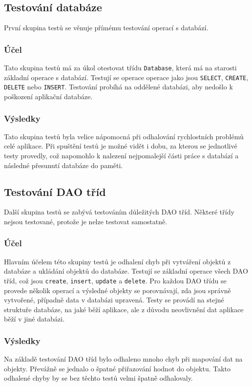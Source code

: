 \documentclass[thesis=B,czech]{resources/FITthesis}[2012/06/26]
\begin{document}
		\subsection{Testování databáze}
První skupina testů se věnuje přímému testování operací s databází. 
			\subsubsection*{Účel}
Tato skupina testů má za úkol otestovat třídu \texttt{Database}, která má na starosti základní operace s databází. Testují se operace operace jako jsou \texttt{SELECT}, \texttt{CREATE}, \texttt{DELETE} nebo \texttt{INSERT}. Testování probíhá na oddělené databázi, aby nedošlo k poškození aplikační databáze. 			

			\subsubsection*{Výsledky}
Tato skupina testů byla velice nápomocná při odhalování rychlostních problémů celé aplikace. Při spuštění testů je možné vidět i dobu, za kterou se jednotlivé testy provedly, což napomohlo k nalezení nejpomalejší části práce s databází a následné přesunutí databáze do paměti.

		\subsection{Testování DAO tříd}
Další skupina testů se zabývá testováním důležitých DAO tříd. Některé třídy nejsou testované, protože je nelze testovat samostatně.
			\subsubsection*{Účel}
Hlavním účelem této skupiny testů je odhalení chyb při vytváření objektů z databáze a ukládání objektů do databáze. Testují se základní operace všech DAO tříd, což jsou \texttt{create}, \texttt{insert}, \texttt{update} a \texttt{delete}. Pro každou DAO třídu se provede několik operací a výsledné objekty se porovnávají, zda jsou správně vytvořené, případně data v databázi upravená. Testy se provádí na stejné struktuře databáze, na jaké běží aplikace, ale z důvodu neovlivnění dat aplikace běží v jiné databázi.
			
			\subsubsection*{Výsledky}
Na základě testování DAO tříd bylo odhaleno mnoho chyb při mapování dat na objekty. Převážně se jednalo o špatné přiřazování hodnot do objektu. Takto odhalené chyby by se bez těchto testů velmi špatně odhalovaly.			
\end{document}

